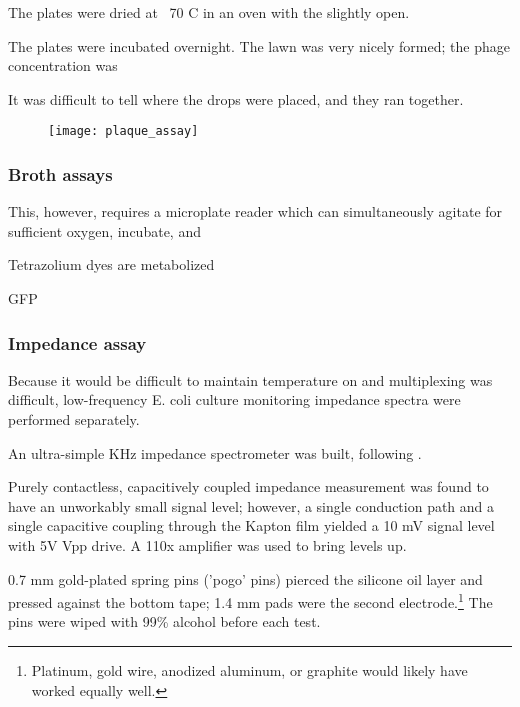 \documentclass[paper.tex]{subfiles}
\begin{document}
\begin{toolchain}
The plates were dried at ~70 C in an oven with the slightly open.

The plates were incubated overnight. The lawn was very nicely formed; the phage concentration was

It was difficult to tell where the drops were placed, and they ran together.


\begin{figure}[H]
	\captionsetup{singlelinecheck = false, justification=justified}
	\centering
	\texttt{[image: plaque\_assay]}
\end{figure}



\end{toolchain}










\subsubsection{Broth assays}

This, however, requires a microplate reader which can simultaneously agitate for sufficient oxygen, incubate, and 

Tetrazolium dyes are metabolized 

GFP


\subsubsection{Impedance assay}


Because it would be difficult to maintain temperature on and multiplexing was difficult, low-frequency E. coli culture monitoring impedance spectra were performed separately.

An ultra-simple KHz impedance spectrometer was built, following \cite{unconventional2015}.

Purely contactless, capacitively coupled impedance measurement was found to have an unworkably small signal level;
however, a single conduction path and a single capacitive coupling through the Kapton film yielded a 10 mV signal level with 5V Vpp drive. A 110x amplifier was used to bring levels up.

0.7 mm gold-plated spring pins ('pogo' pins) pierced the silicone oil layer and pressed against the bottom tape; 1.4 mm pads were the second electrode.\footnote{Platinum, gold wire, anodized aluminum, or graphite would likely have worked equally well.} The pins were wiped with 99\% alcohol before each test.
\end{document}
